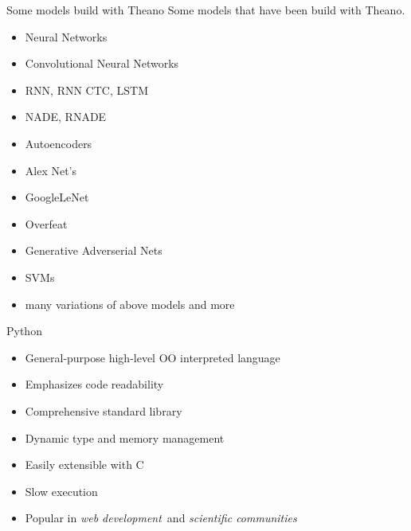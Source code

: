 \documentclass[utf8x,xcolor=pdftex,dvipsnames,table]{beamer}
\begin{document}
\begin{frame}{Some models build with Theano}
  Some models that have been build with Theano.
  \begin{itemize}
  \item Neural Networks
  \item Convolutional Neural Networks
  \item RNN, RNN CTC, LSTM
  \item NADE, RNADE
  \item Autoencoders
  \item Alex Net's
  \item GoogleLeNet
  \item Overfeat
  \item Generative Adverserial Nets
  \item SVMs
  \item \begin{bf}many variations of above models and more\end{bf}
  \end{itemize}
\end{frame}


\begin{frame}{Python}
  \begin{itemize}
  \item General-purpose high-level OO interpreted language
  \item Emphasizes code readability
  \item Comprehensive standard library
  \item Dynamic type and memory management
  \item Easily extensible with C
  \item Slow execution
  \item Popular in {\em web development}\ and {\em scientific communities}
  \end{itemize}
\end{frame}
\end{document}
